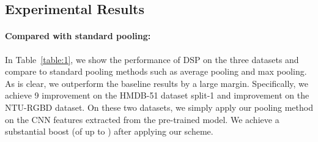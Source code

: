 \documentclass[runningheads]{llncs}
\begin{document}
\subsection{Experimental Results}
\paragraph*{\textbf{Compared with standard pooling:}} In Table~\ref{table:1}, we show the performance of DSP on the three datasets and compare to standard pooling methods such as average pooling and max pooling. As is clear, we outperform the baseline results by a large margin. Specifically, we achieve 9 improvement on the HMDB-51 dataset split-1 and  improvement on the NTU-RGBD dataset. On these two datasets, we simply apply our pooling method on the CNN features extracted from the pre-trained model. We achieve a substantial boost (of up to ) after applying our scheme.
\end{document}
